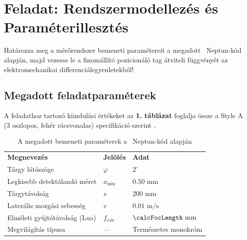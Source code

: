 
\section{Feladat: Rendszermodellezés és Paraméterillesztés}


\begin{problem}[15 pont]
Határozza meg a mérőrendszer bemeneti paramétereit a megadott \NeptunCode\ Neptun-kód alapján, majd vezesse le a finomállító pozicionáló tag átviteli függvényét az elektromechanikai differenciálegyenletekből!
\end{problem}

\subsection{Megadott feladatparaméterek}
A feladathoz tartozó kiindulási értékeket az \textbf{1. táblázat} foglalja össze a Style A (3 oszlopos, fehér rácsvonalas) specifikáció szerint \cite{bme_mogi_meresi_utmutato}.

\begin{table}[ht!]
\centering
\renewcommand{\arraystretch}{1.25}
\setlength{\tabcolsep}{8pt}
\setlength{\arrayrulewidth}{2pt}
\begin{tabularx}{\textwidth}{|X|X|X|}
\hline
\rowcolor{tableGray}
\textbf{Megnevezés} & \textbf{Jelölés} & \textbf{Adat} \\
\tableheaderrule
Tárgy látószöge & $\varphi$ & $2^\circ$ \\ \hline
Legkisebb detektálandó méret & $x_{\min}$ & $0.50\text{ mm}$ \\ \hline
Tárgytávolság & $s$ & $200\text{ mm}$ \\ \hline
Laterális mozgási sebesség & $v$ & $0.01\text{ m/s}$ \\ \hline
Elméleti gyújtótávolság (Lua) & $f_{\text{calc}}$ & $\calcFocLength\text{ mm}$ \\ \hline
Megvilágítás típusa & --- & Természetes monokróm \\ \hline
\end{tabularx}
\caption{A megadott bemeneti paraméterek a \NeptunCode\ Neptun-kód alapján \cite{bme_mogi_meresi_utmutato}}
\label{tab:megadott_adatok}
\end{table}

